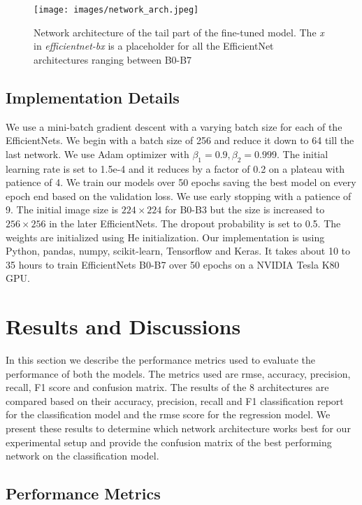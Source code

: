 \documentclass[fleqn,usenatbib]{mnras}
\begin{document}
\begin{figure}
    \centering
    \texttt{[image: images/network\_arch.jpeg]}
    \caption{Network architecture of the tail part of the fine-tuned model. The \textit{x} in \textit{efficientnet-bx} is a placeholder for all the EfficientNet architectures ranging between B0-B7}
    \label{fig:Network Architecture}
\end{figure} 

\subsection{Implementation Details}
\hspace*{0.25in}We use a mini-batch gradient descent with a varying batch size for each of the EfficientNets. We begin with a batch size of 256 and reduce it down to 64 till the last network. We use Adam optimizer with $\beta_1 = 0.9 , \beta_2 = 0.999$. The initial learning rate is set to 1.5e-4 and it reduces by a factor of 0.2 on a plateau with patience of 4. We train our models over 50 epochs saving the best model on every epoch end based on the validation loss. We use early stopping with a patience of 9. The initial image size is $224\times224$ for B0-B3 but the size is increased to $256\times256$ in the later EfficientNets. The dropout probability is set to 0.5. The weights are initialized using He initialization. Our implementation is using Python, pandas, numpy, scikit-learn, Tensorflow and Keras. It takes about 10 to 35 hours to train EfficientNets B0-B7 over 50 epochs on a NVIDIA Tesla K80 GPU.

\section{Results and Discussions}
\hspace*{0.25in}In this section we describe the performance metrics used to evaluate the performance of both the models. The metrics used are rmse, accuracy, precision, recall, F1 score and confusion matrix. The results of the 8 architectures are compared based on their accuracy, precision, recall and F1 classification report for the classification model and the rmse score for the regression model. We present these results to determine which network architecture works best for our experimental setup and provide the confusion matrix of the best performing network on the classification model. 

\subsection{Performance Metrics}
\end{document}
